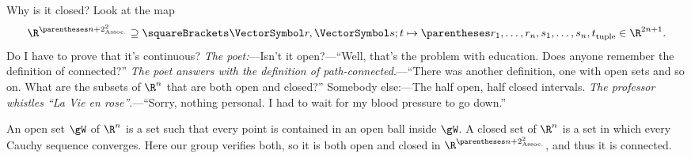 \documentclass[10pt, a4paper, twoside]{lecturenotes}
\newcommand{\Rn}{{\R^n}}
\begin{document}
Why is it closed? Look at the map\[
\FunctionBody{\R^{\pa{n+2}^2}\Superset\Helt \vr \vs t} {\tuple{r_1,\dotsc,r_n,s_1,\dotsc,s_n,t}\in\R^{2n+1}}\text.
\]
Do I have to prove that it's continuous? 
\emph{The poet:}---Isn't it open?---``Well, that's the problem with education. Does anyone remember the definition of connected?'' \emph{The poet answers with the definition of path-connected}.---``There was another definition, one with open sets and so on. What are the subsets of $\Rn$ that are both open and closed?'' Somebody else:---The half open, half closed intervals. \emph{The professor whistles ``La Vie en rose''}.---``Sorry, nothing personal. I had to wait for my blood pressure to go down.''

An open set $\gW$ of $\Rn$ is a set such that every point is contained in an open ball inside $\gW$. A closed set of  $\Rn$ is a set in which every Cauchy sequence converges. Here our group verifies both, so it is both open and closed in $\R^{\pa{n+2}^2}$, and thus it is connected.
\end{document}

